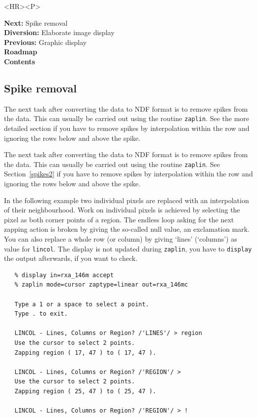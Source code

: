 \documentclass[11pt]{article}
\newenvironment{latexonly}{}{}
\newcommand{\htmlref}[2]{#1}
\newcommand{\xref}[3]{#1}
\newcommand{\xlabel}[1]{}
\begin{document}
\begin{htmlonly}
\begin{rawhtml} <HR><P> \end{rawhtml}
{\bf \htmlref{Next:}{spikes}} Spike removal\\
{\bf \htmlref{Diversion:}{display2}} Elaborate image display\\
{\bf \htmlref{Previous:}{idset}} Graphic display\\
{\bf \htmlref{Roadmap}{roadmap}}\\
{\bf \htmlref{Contents}{stardoccontents}}\\
\end{htmlonly}


\subsection{\label{spikes}\xlabel{spikes}Spike removal}

\begin{htmlonly}
   The next task after converting the data to NDF format
   is to remove spikes from the data. This can usually
   be carried out using the routine
{\tt \xref{zaplin}{sun95}{ZAPLIN}}.
   See the
\htmlref{more detailed section}{spikes2}
   if you have to remove spikes by interpolation within the row and
   ignoring the rows below and above the spike.
\end{htmlonly}
\begin{latexonly}
   The next task after converting the data to NDF format
   is to remove spikes from the data. This can usually
   be carried out using the routine
{\tt \xref{zaplin}{sun95}{ZAPLIN}}.
   See
Section~\ref{spikes2}
   if you have to remove spikes by interpolation within the row and
   ignoring the rows below and above the spike.
\end{latexonly}

   In the following example two individual pixels are replaced with an
   interpolation of their neighbourhood. Work on individual pixels is
   achieved by selecting the pixel as both corner points of a region.
   The endless loop asking for the next zapping action is broken by
   giving the so-called
\htmlref{null value,}{glossnullvalue}
   an exclamation mark. You can also
   replace a whole row (or column) by giving `lines' (`columns') as
   value for {\tt lincol}. The display is not updated during
   {\tt zaplin}, you
   have to
{\tt \xref{display}{sun95}{DISPLAY}}
   the output afterwards, if you want to check.

\begin{verbatim}
   % display in=rxa_146m accept
   % zaplin mode=cursor zaptype=linear out=rxa_146mc

   Type a 1 or a space to select a point.
   Type . to exit.

   LINCOL - Lines, Columns or Region? /'LINES'/ > region
   Use the cursor to select 2 points.
   Zapping region ( 17, 47 ) to ( 17, 47 ).

   LINCOL - Lines, Columns or Region? /'REGION'/ >
   Use the cursor to select 2 points.
   Zapping region ( 25, 47 ) to ( 25, 47 ).

   LINCOL - Lines, Columns or Region? /'REGION'/ > !
\end{verbatim}
\end{document}
